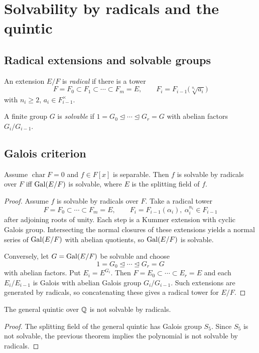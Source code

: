 \section{Solvability by radicals and the quintic}\label{sec:radicals-quintic}

\subsection{Radical extensions and solvable groups}
\begin{definition}
An extension $E/F$ is \emph{radical} if there is a tower
\[
F=F_0\subset F_1\subset\cdots\subset F_m=E,\qquad
F_i=F_{i-1}\bigl(\sqrt[n_i]{a_i}\bigr)
\]
with $n_i\ge2$, $a_i\in F_{i-1}^\times$.
\end{definition}
\begin{definition}
A finite group $G$ is \emph{solvable} if $1=G_0\trianglelefteq\cdots\trianglelefteq G_r=G$ with abelian factors $G_i/G_{i-1}$.
\end{definition}

\subsection{Galois criterion}
\begin{theorem}\label{thm:radicals-criterion}
Assume $\operatorname{char}F=0$ and $f\in F[x]$ is separable. Then $f$ is solvable by radicals over $F$ iff $\operatorname{Gal}(E/F)$ is solvable, where $E$ is the splitting field of $f$.
\end{theorem}
\begin{proof}
Assume $f$ is solvable by radicals over $F$. Take a radical tower
\[
F=F_0\subset\cdots\subset F_m=E,\qquad F_i=F_{i-1}(\alpha_i),\ \alpha_i^{n_i}\in F_{i-1}
\]
after adjoining roots of unity. Each step is a Kummer extension with cyclic Galois group. Intersecting the normal closures of these extensions yields a normal series of $\operatorname{Gal}(E/F)$ with abelian quotients, so $\operatorname{Gal}(E/F)$ is solvable.

Conversely, let $G=\operatorname{Gal}(E/F)$ be solvable and choose
\[
1=G_0\trianglelefteq\cdots\trianglelefteq G_r=G
\]
with abelian factors. Put $E_i=E^{G_i}$. Then $F=E_0\subset\cdots\subset E_r=E$ and each $E_i/E_{i-1}$ is Galois with abelian Galois group $G_i/G_{i-1}$. Such extensions are generated by radicals, so concatenating these gives a radical tower for $E/F$.
\end{proof}
\begin{theorem}
The general quintic over $\mathbb{Q}$ is not solvable by radicals.
\end{theorem}
\begin{proof}
The splitting field of the general quintic has Galois group $S_5$. Since $S_5$ is not solvable, the previous theorem implies the polynomial is not solvable by radicals.
\end{proof}

